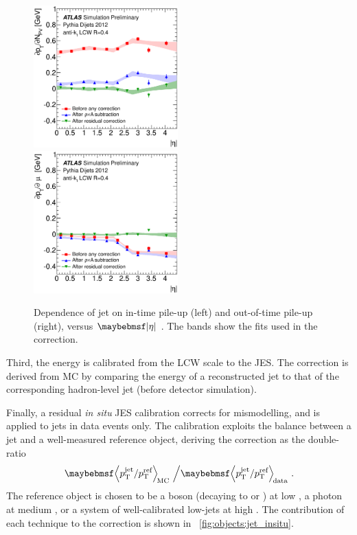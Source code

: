 \begin{description}
	\begin{figure}
		\includegraphics[width=0.495\textwidth]{tex/selection/jet_pu_npv}
		\hfill
		\includegraphics[width=0.495\textwidth]{tex/selection/jet_pu_mu}
		\caption{Dependence of jet \pt on in-time pile-up (left) and out-of-time pile-up 
		(right), versus $\mods{\eta}$ \cite{Jets:PileupCorrection:2012}. The bands show 
		the fits used in the correction.}
		\label{fig:objects:jet_pu_corr}
	\end{figure}

	Third, the energy is calibrated from the LCW scale to the JES. The correction is 
	derived from MC by comparing the energy of a reconstructed jet to that of the 
	corresponding hadron-level jet (\ie before detector simulation).

	Finally, a residual \textit{in situ} JES calibration corrects for mismodelling, 
	and is applied to jets in data events only. The calibration exploits the \pt 
	balance between a jet and a well-measured reference object, deriving the correction 
	as the double-ratio
	\begin{equation}
		\angles{p_{\text{T}}^{\text{jet}} / p_{\text{T}}^{\text{ref}}}_{\text{\!MC}} 
		\,\, \Big/ 
		\angles{p_{\text{T}}^{\text{jet}} / p_{\text{T}}^{\text{ref}}}_{\text{\!data}} 
		\,\,.
	\end{equation}
	The reference object is chosen to be a \PZ boson (decaying to \epluseminus or 
	\HepProcess{\APmuon\Pmuon}) at low \pt, a photon at medium \pt, or a system of 
	well-calibrated low-\pt jets at high \pt. The contribution of each technique to 
	the correction is shown in \Figure~\ref{fig:objects:jet_insitu}.


\end{description}
